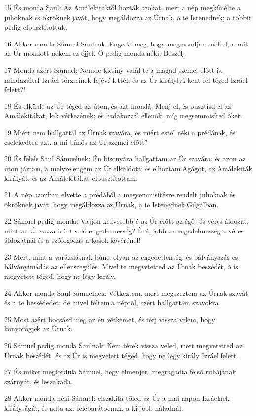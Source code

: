 \par 15 És monda Saul: Az Amálekitáktól hozták azokat, mert a nép megkímélte a juhoknak és ökröknek javát, hogy megáldozza az Úrnak, a te Istenednek; a többit pedig elpusztítottuk.
\par 16 Akkor monda Sámuel Saulnak: Engedd meg, hogy megmondjam néked, a mit az Úr mondott nékem ez éjjel. Õ pedig monda néki: Beszélj.
\par 17 Monda azért Sámuel: Nemde kicsiny valál te a magad szemei elõtt is, mindazáltal Izráel törzseinek fejévé lettél, és az Úr királylyá kent fel téged Izráel felett?!
\par 18 És elkülde az Úr téged az úton, és azt mondá: Menj el, és pusztísd el az Amálekitákat, kik vétkezének; és hadakozzál ellenök, míg megsemmisíted õket.
\par 19 Miért nem hallgattál az Úrnak szavára, és miért estél néki a prédának, és cselekedted azt, a mi bûnös az Úr szemei elõtt?
\par 20 És felele Saul Sámuelnek: Én bizonyára hallgattam az Úr szavára, és azon az úton jártam, a melyre engem az Úr elküldött; és elhoztam Agágot, az Amálekiták királyát, és az Amálekitákat elpusztítottam.
\par 21 A nép azonban elvette a prédából a megsemmisítésre rendelt juhoknak és ökröknek javát, hogy megáldozza az Úrnak, a te Istenednek Gilgálban.
\par 22 Sámuel pedig monda: Vajjon kedvesebb-é az Úr elõtt az égõ- és véres áldozat, mint az Úr szava iránt való engedelmesség? Ímé, jobb az engedelmesség a véres áldozatnál és a szófogadás a kosok kövérénél!
\par 23 Mert, mint a varázslásnak bûne, olyan az engedetlenség; és bálványozás és bálványimádás az ellenszegülés. Mivel te megvetetted az Úrnak beszédét, õ is megvetett téged, hogy ne légy király.
\par 24 Akkor monda Saul Sámuelnek: Vétkeztem, mert megszegtem az Úrnak szavát és a te beszédedet; de mivel féltem a néptõl, azért hallgattam szavokra.
\par 25 Most azért bocsásd meg az én vétkemet, és térj vissza velem, hogy könyörögjek az Úrnak.
\par 26 Sámuel pedig monda Saulnak: Nem térek vissza veled, mert megvetetted az Úrnak beszédét, és az Úr is megvetett téged, hogy ne légy király Izráel felett.
\par 27 És mikor megfordula Sámuel, hogy elmenjen, megragadta felsõ ruhájának szárnyát, és leszakada.
\par 28 Akkor monda néki Sámuel: elszakítá tõled az Úr a mai napon Izráelnek királyságát, és adta azt felebarátodnak, a ki jobb náladnál.
